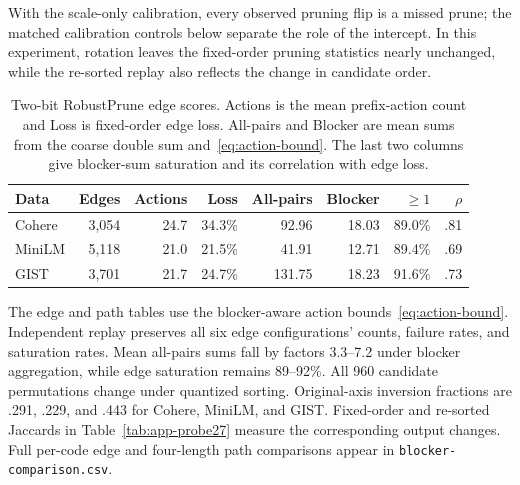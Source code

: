 With the scale-only calibration, every observed pruning flip is a missed prune; the matched calibration controls below separate the role of the intercept. In this experiment, rotation leaves the fixed-order pruning statistics nearly unchanged, while the re-sorted replay also reflects the change in candidate order.

\begin{table}[tbp]
\centering


\small
\setlength{\tabcolsep}{3pt}
\begin{tabular}{lrrrrrrr}
\toprule
Data & Edges & Actions & Loss & All-pairs & Blocker & $\ge1$ & $\rho$ \\
\midrule
Cohere & 3{,}054 & 24.7 & 34.3\% & 92.96 & 18.03 & 89.0\% & .81 \\
MiniLM & 5{,}118 & 21.0 & 21.5\% & 41.91 & 12.71 & 89.4\% & .69 \\
GIST & 3{,}701 & 21.7 & 24.7\% & 131.75 & 18.23 & 91.6\% & .73 \\
\bottomrule
\end{tabular}

\small
\caption{Two-bit RobustPrune edge scores. Actions is the mean prefix-action count and Loss is fixed-order edge loss. All-pairs and Blocker are mean sums from the coarse double sum and~\eqref{eq:action-bound}. The last two columns give blocker-sum saturation and its correlation with edge loss.}
\label{tab:app-edge-cert}
\end{table}

The edge and path tables use the blocker-aware action bounds~\eqref{eq:action-bound}. Independent replay preserves all six edge configurations' counts, failure rates, and saturation rates. Mean all-pairs sums fall by factors 3.3--7.2 under blocker aggregation, while edge saturation remains 89--92\%. All 960 candidate permutations change under quantized sorting. Original-axis inversion fractions are .291, .229, and .443 for Cohere, MiniLM, and GIST. Fixed-order and re-sorted Jaccards in Table~\ref{tab:app-probe27} measure the corresponding output changes. Full per-code edge and four-length path comparisons appear in \texttt{blocker-comparison.csv}.

